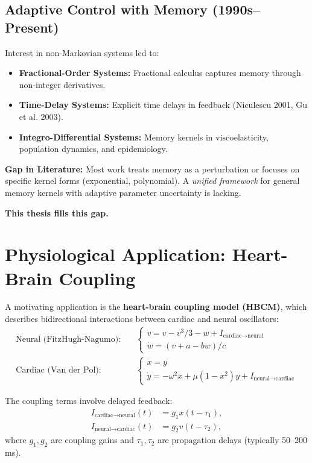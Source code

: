 \subsection{Adaptive Control with Memory (1990s--Present)}

Interest in non-Markovian systems led to:
\begin{itemize}
    \item \textbf{Fractional-Order Systems:} Fractional calculus captures memory through non-integer derivatives.
    \item \textbf{Time-Delay Systems:} Explicit time delays in feedback (Niculescu 2001, Gu et al. 2003).
    \item \textbf{Integro-Differential Systems:} Memory kernels in viscoelasticity, population dynamics, and epidemiology.
\end{itemize}

\textbf{Gap in Literature:} Most work treats memory as a perturbation or focuses on specific kernel forms (exponential, polynomial). A \textit{unified framework} for general memory kernels with adaptive parameter uncertainty is lacking.

\textbf{This thesis fills this gap.}

\section{Physiological Application: Heart-Brain Coupling}

A motivating application is the \textbf{heart-brain coupling model (HBCM)}, which describes bidirectional interactions between cardiac and neural oscillators:
\begin{align}
    \text{Neural (FitzHugh-Nagumo):} \quad &
    \begin{cases}
        \dot{v} = v - v^3/3 - w + I_{\text{cardiac} \to \text{neural}} \\
        \dot{w} = (v + a - bw) / c
    \end{cases} \\[0.5em]
    \text{Cardiac (Van der Pol):} \quad &
    \begin{cases}
        \dot{x} = y \\
        \dot{y} = -\omega^2 x + \mu (1 - x^2) y + I_{\text{neural} \to \text{cardiac}}
    \end{cases}
\end{align}

The coupling terms involve delayed feedback:
\begin{align}
    I_{\text{cardiac} \to \text{neural}}(t) &= g_1 x(t - \tau_1), \\
    I_{\text{neural} \to \text{cardiac}}(t) &= g_2 v(t - \tau_2),
\end{align}
where $g_1, g_2$ are coupling gains and $\tau_1, \tau_2$ are propagation delays (typically 50--200 ms).

